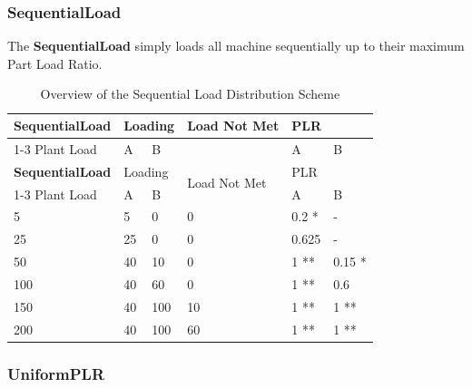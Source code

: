 \subsubsection{SequentialLoad}%
\label{ssub:sequentialload}

The \textbf{SequentialLoad} simply loads all machine sequentially up to their maximum Part Load Ratio.

\begin{longtable}[c]{|l|p{0.5in}|p{0.5in}|l|p{0.5in}|p{0.5in}|}
    \caption{Overview of the Sequential Load Distribution Scheme}
    \label{tab:sequantial-load-overview}\\
\hline

\textbf{SequentialLoad} & \multicolumn{2}{l|}{Loading} & \multirow{2}{*}{Load Not Met} & \multicolumn{2}{l|}{PLR} \\ \cline{1-3} \cline{5-6}
Plant Load      & A             & B            &                               & A          & B           \\ \hline
\endfirsthead
\hline
\textbf{SequentialLoad} & \multicolumn{2}{l|}{Loading} & \multirow{2}{*}{Load Not Met} & \multicolumn{2}{l|}{PLR} \\ \cline{1-3} \cline{5-6}
Plant Load      & A             & B            &                               & A          & B           \\ \hline
\endhead

5               & 5             & 0            & 0                             & 0.2 *      & -           \\ \hline
25              & 25            & 0            & 0                             & 0.625      & -           \\ \hline
50              & 40            & 10           & 0                             & 1 **       & 0.15 *      \\ \hline
100             & 40            & 60           & 0                             & 1 **       & 0.6         \\ \hline
150             & 40           & 100           & 10                            & 1 **       & 1 **        \\ \hline
200             & 40           & 100           & 60                            & 1 **       & 1 **        \\ \hline
\end{longtable}


\subsubsection{UniformPLR}%
\label{ssub:uniformplr}

